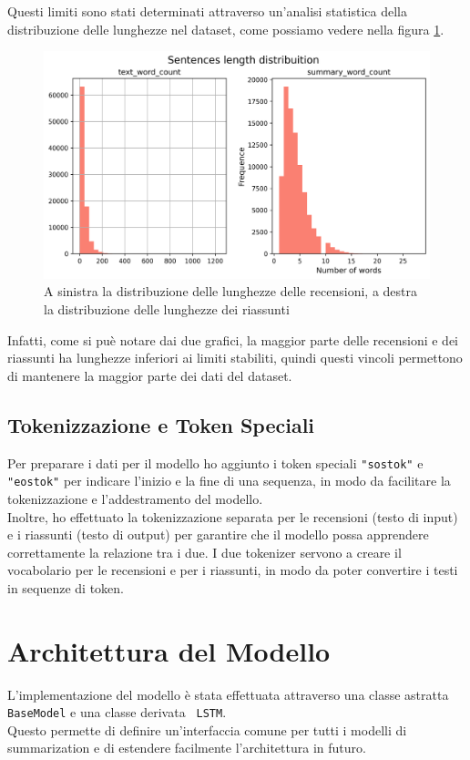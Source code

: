 \documentclass[a4paper, 12pt]{article}
\begin{document}
Questi limiti sono stati determinati attraverso un'analisi statistica della distribuzione delle lunghezze nel dataset, come possiamo vedere nella figura \ref{fig:dataset_length_distribuition}.
\begin{figure}[H]
    \centering
    \includegraphics[width=1\textwidth]{media/dataset_length_distribuition.png}
    \caption{A sinistra la distribuzione delle lunghezze delle recensioni, a destra la distribuzione delle lunghezze dei riassunti}
    \label{fig:dataset_length_distribuition}
\end{figure}
Infatti, come si puè notare dai due grafici, la maggior parte delle recensioni e dei riassunti ha lunghezze inferiori ai limiti stabiliti, quindi questi vincoli permettono di mantenere la maggior parte dei dati del dataset.

\subsection{Tokenizzazione e Token Speciali}
Per preparare i dati per il modello ho aggiunto i token speciali \texttt{"sostok"} e \texttt{"eostok"} per indicare l'inizio e la fine di una sequenza, in modo da facilitare la tokenizzazione e l'addestramento del modello.\\
Inoltre, ho effettuato la tokenizzazione separata per le recensioni (testo di input) e i riassunti (testo di output) per garantire che il modello possa apprendere correttamente la relazione tra i due.
I due tokenizer servono a creare il vocabolario per le recensioni e per i riassunti, in modo da poter convertire i testi in sequenze di token.

\section{Architettura del Modello}
L'implementazione del modello è stata effettuata attraverso una classe astratta \texttt{BaseModel} e una classe derivata \texttt{   LSTM}.\\
Questo permette di definire un'interfaccia comune per tutti i modelli di summarization e di estendere facilmente l'architettura in futuro.\\
\end{document}
